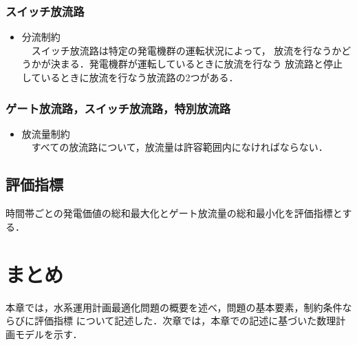 	\subsubsection*{スイッチ放流路}
		\begin{itemize}
			\item 分流制約 \\
			　スイッチ放流路は特定の発電機群の運転状況によって，%
			放流を行なうかどうかが決まる．発電機群が運転しているときに放流を行なう
			放流路と停止しているときに放流を行なう放流路の2つがある．
		\end{itemize}	
	\subsubsection*{ゲート放流路，スイッチ放流路，特別放流路}
		\begin{itemize}
			\item 放流量制約 \\
			　すべての放流路について，放流量は許容範囲内になければならない．
		\end{itemize}
	
	\subsection{評価指標}
		時間帯ごとの発電価値の総和最大化とゲート放流量の総和最小化を評価指標とする．
		
\section{まとめ}
本章では，水系運用計画最適化問題の概要を述べ，問題の基本要素，制約条件ならびに評価指標%
について記述した．次章では，本章での記述に基づいた数理計画モデルを示す．
